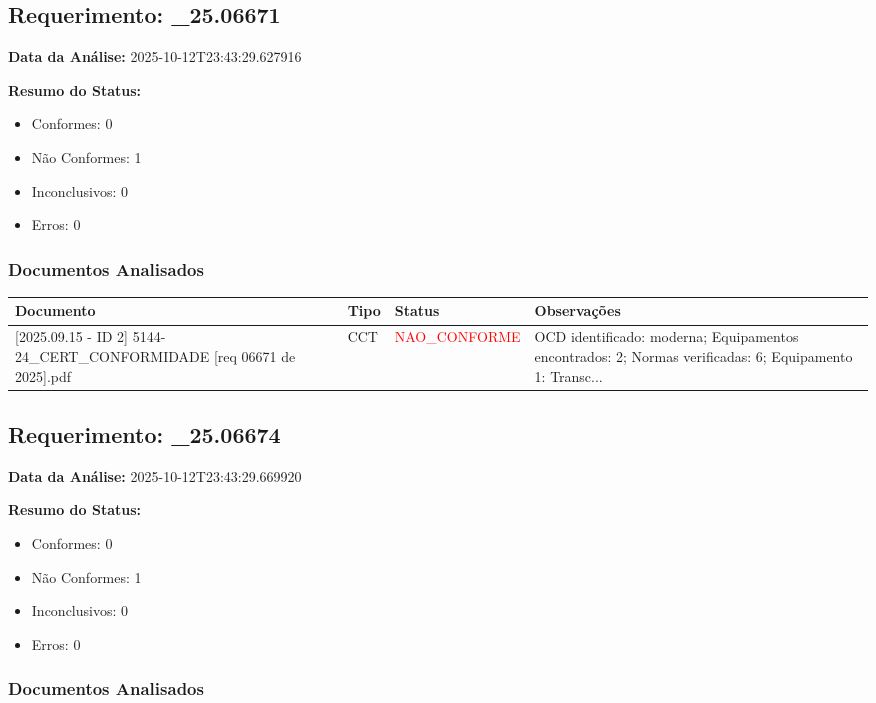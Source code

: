 \documentclass[12pt,a4paper]{article}
\begin{document}
\subsection{Requerimento: \_25.06671}

\textbf{Data da Análise:} 2025-10-12T23:43:29.627916

\textbf{Resumo do Status:}
\begin{itemize}
    \item Conformes: 0
    \item Não Conformes: 1
    \item Inconclusivos: 0
    \item Erros: 0
\end{itemize}

\subsubsection{Documentos Analisados}

\begin{longtable}{|p{4cm}|p{2cm}|p{2cm}|p{6cm}|}
\hline
\textbf{Documento} & \textbf{Tipo} & \textbf{Status} & \textbf{Observações} \\
\hline
\endhead
[Certificado de Conformidade Técnica - CCT][2025.09.15 - ID 2] 5144-24\_CERT\_CONFORMIDADE [req 06671 de 2025].pdf & CCT & \textcolor{red}{NAO\_CONFORME} & OCD identificado: moderna; Equipamentos encontrados: 2; Normas verificadas: 6; Equipamento 1: Transc... \\
\hline
\end{longtable}


\subsection{Requerimento: \_25.06674}

\textbf{Data da Análise:} 2025-10-12T23:43:29.669920

\textbf{Resumo do Status:}
\begin{itemize}
    \item Conformes: 0
    \item Não Conformes: 1
    \item Inconclusivos: 0
    \item Erros: 0
\end{itemize}

\subsubsection{Documentos Analisados}
\end{document}
